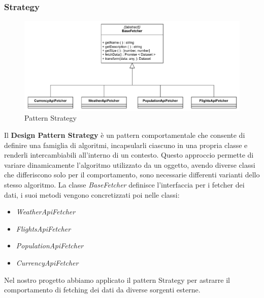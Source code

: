 \subsubsection{Strategy}
\begin{figure}[h!] \centering       
    \includegraphics[scale = 0.55]{template/images/Strategy.png}
    \caption{Pattern Strategy}
\end{figure}
Il \textbf{Design Pattern Strategy} è un pattern comportamentale che consente di definire una famiglia di algoritmi, incapsularli ciascuno in una propria classe e renderli intercambiabili all'interno di un contesto.
Questo approccio permette di variare dinamicamente l'algoritmo utilizzato da un oggetto, avendo diverse classi che differiscono solo per il comportamento, sono necessarie differenti varianti dello stesso algoritmo.
La classe \textit{BaseFetcher} definisce l'interfaccia per i fetcher dei dati, i suoi metodi vengono concretizzati poi nelle classi:
\begin{itemize}
    \item \textit{WeatherApiFetcher}
    \item \textit{FlightsApiFetcher}
    \item \textit{PopulationApiFetcher}
    \item \textit{CurrencyApiFetcher}
\end{itemize}
Nel nostro progetto abbiamo applicato il pattern Strategy per astrarre il comportamento di fetching dei dati da diverse sorgenti esterne.

